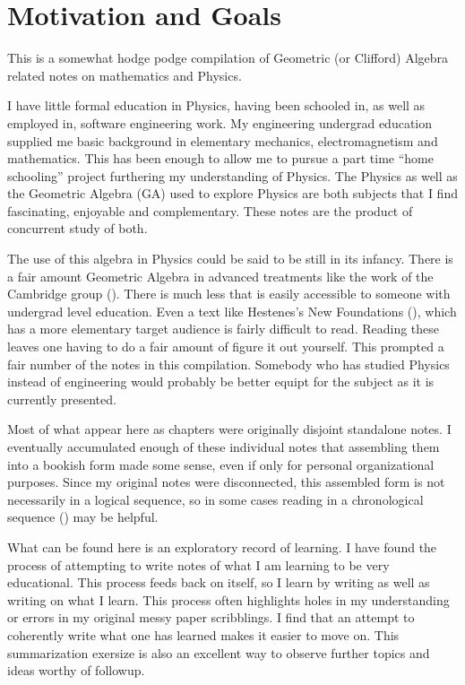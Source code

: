 \chapter*{Motivation and Goals}\normalsize

This is a somewhat hodge podge compilation of Geometric (or Clifford) Algebra related notes on mathematics and Physics.

I have little formal education in Physics, having been schooled in, as well as employed in, software engineering work.  My engineering undergrad education supplied me basic background in elementary mechanics, electromagnetism and mathematics.  This has been enough to allow me to pursue a part time ``home schooling'' project furthering my understanding of Physics.  The Physics as well as the Geometric Algebra (GA) used to explore Physics are both subjects that I find fascinating, enjoyable and complementary.  These notes are the product of concurrent study of both.

The use of this algebra in Physics could be said to be still in its infancy.  There is a fair amount Geometric Algebra in advanced treatments like the work of the Cambridge group (\citep{doran2003gap}).  There is much less that is easily accessible to someone with undergrad level education.  Even a text like Hestenes's New Foundations (\citep{hestenes1999nfc}), which has a more elementary target audience is fairly difficult to read.  Reading these leaves one having to do a fair amount of figure it out yourself.  This prompted a fair number of the notes in this compilation.  Somebody who has studied Physics instead of engineering would probably be better equipt for the subject as it is currently presented.

Most of what appear here as chapters were originally disjoint standalone notes.  I eventually accumulated enough of these individual notes that assembling them into a bookish form made some sense, even if only for personal organizational purposes.  Since my original notes were disconnected, this assembled form is not necessarily in a logical sequence, so in some cases reading in a chronological sequence () may be helpful.

What can be found here is an exploratory record of learning.  I have found the process of attempting to write notes of what I am learning to be very educational.  This process feeds back on itself, so I learn by writing as well as writing on what I learn.  This process often highlights holes in my understanding or errors in my original messy paper scribblings.  I find that an attempt to coherently write what one has learned makes it easier to move on.  This summarization exersize is also an excellent way to observe further topics and ideas worthy of followup.


